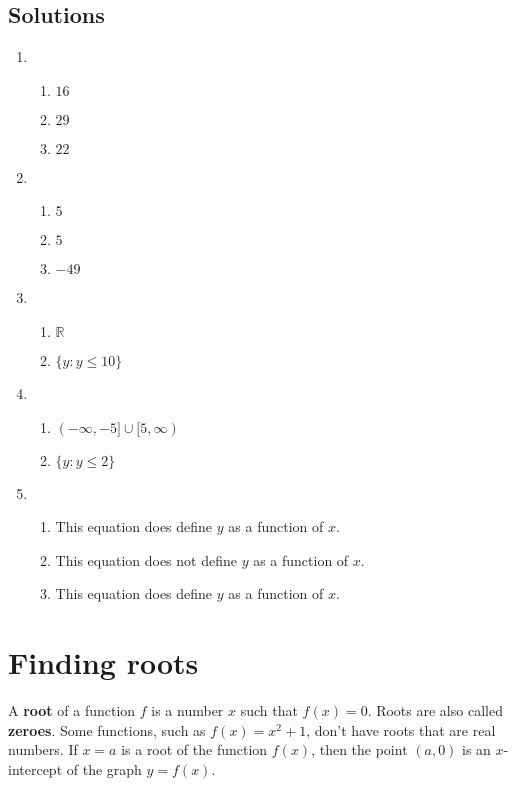 \documentclass[11pt]{book}               %
\begin{document}
\subsection{Solutions}
\begin{enumerate}
\item 
\begin{enumerate}
\item $16$ 
\item $29$
\item $22$ 
\end{enumerate}
\item 
\begin{enumerate}
\item $5$ 
\item $5$
\item $-49$ 
\end{enumerate}

\item 
\begin{enumerate}
\item $\mathbb{R}$
\item $\{y: y \leq 10\}$
\end{enumerate}

\item 
\begin{enumerate}
\item $(-\infty, -5] \cup [5, \infty)$
\item $\{y: y \leq 2\}$
\end{enumerate}


\item
\begin{enumerate}
\item This equation does define $y$ as a function of $x$.
\item This equation does not define $y$ as a function of $x$.
\item This equation does define $y$ as a function of $x$.
\end{enumerate}
\end{enumerate}

\newpage
\section{Finding roots}

A \textbf{root} of a function $f$ is a number $x$ such that $f(x) = 0$. Roots are also called \textbf{zeroes}.
Some functions, such as $f(x) = x^2+1$, don't have roots that are real numbers.  If $x=a$ is a root of the function $f(x)$, then the point $(a,0)$ is an $x$-intercept of the graph $y=f(x)$. 
\end{document}
